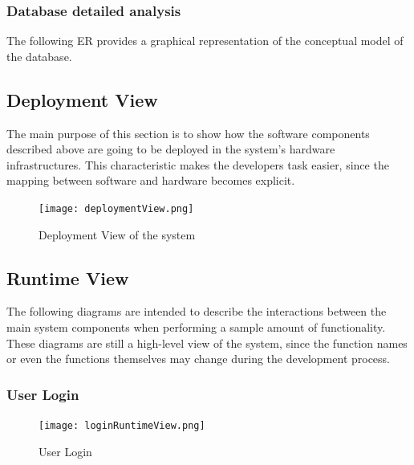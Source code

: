 \documentclass[12pt]{article}
\begin{document}
\subsubsection{Database detailed analysis}
The following ER provides a graphical representation of the conceptual model of the database.

\subsection{Deployment View}
The main purpose of this section is to show how the software components described above are going to be deployed in the system's hardware infrastructures. This characteristic makes the developers task easier, since the mapping between software and hardware becomes explicit.

\begin{figure}[H]
    \centering
    \texttt{[image: deploymentView.png]}
    \caption{Deployment View of the system}
    \label{fig:componentView}
\end{figure}


\subsection{Runtime View}
The following diagrams are intended to describe the interactions between the main system components when performing a sample amount of functionality. These diagrams are still a high-level view of the system, since the function names or even the functions themselves may change during the development process.
\subsubsection{User Login}

\begin{figure}[H]
    \centering
    \texttt{[image: loginRuntimeView.png]}
    \caption{User Login}
    \label{fig:loginRuntime}
\end{figure}
\end{document}
